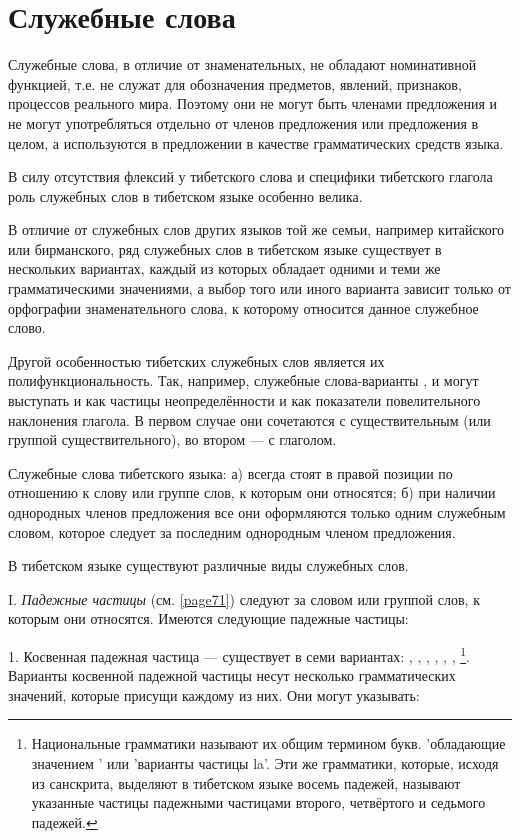 \section{Служебные слова}
\label{sec:ss}

Служебные слова, в отличие от знаменательных, не обладают номинативной функцией, т.е. не служат для обозначения предметов, явлений, признаков, процессов реального мира. Поэтому они не могут быть членами предложения и не могут употребляться отдельно от членов предложения или предложения в целом, а используются в предложении в качестве грамматических средств языка.

В силу отсутствия флексий у тибетского слова и специфики тибетского глагола роль служебных слов в тибетском языке особенно велика.

В отличие от служебных слов других языков той же семьи, например китайского или бирманского, ряд служебных слов в тибетском языке существует в нескольких вариантах, каждый из которых обладает одними и теми же грамматическими значениями, а выбор того или иного варианта зависит только от орфографии знаменательного слова, к которому относится данное служебное слово.

Другой особенностью тибетских служебных слов является их полифункциональность. Так, например, служебные слова-варианты ,  и  могут выступать и как частицы неопределённости и как показатели повелительного наклонения глагола. В первом случае они сочетаются с существительным (или группой существительного), во втором --- с глаголом.

Служебные слова тибетского языка: а) всегда стоят в правой позиции по отношению к слову или группе слов, к которым они относятся; б) при наличии однородных членов предложения все они оформляются только одним служебным словом, которое следует за последним однородным членом предложения.

В тибетском языке существуют различные виды служебных слов.

I. \emph{Падежные частицы} (см. \ref{page71}) следуют за словом или группой слов, к которым они относятся. Имеются следующие падежные частицы:

1. Косвенная падежная частица --- существует в семи
вариантах: , , , , , , \footnote[40]{Национальные грамматики называют их общим термином  букв. 'обладающие значением ' или 'варианты частицы la'. Эти же грамматики, которые, исходя из санскрита, выделяют в тибетском языке восемь падежей, называют указанные частицы падежными частицами второго, четвёртого и седьмого падежей.}.	
Варианты косвенной падежной частицы несут несколько грамматических значений, которые присущи каждому из них. Они могут указывать:


